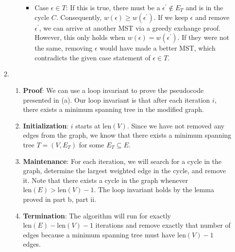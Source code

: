 \documentclass{article}
\begin{document}
\begin{enumerate}
\begin{enumerate}
\begin{enumerate}
\begin{itemize}
                            \item Case $\epsilon \in T$: If this is true, there must be a $\epsilon^\prime
                                \not\in E_T$ and is in the cycle $C$. Consequently, $w\left(\epsilon\right)
                                \geq w\left(\epsilon^{\prime}\right)$. If we keep $\epsilon$ and
                                remove $\epsilon^\prime$, we can arrive at another MST via a greedy
                                exchange proof. However, this only holds when $w\left(\epsilon\right) =
                                w\left(\epsilon^\prime\right)$. If they were not the same, removing $
                                \epsilon$ would have made a better MST, which contradicts the given case
                                statement of $\epsilon \in T$.
                        \end{itemize}

                \end{enumerate}
                
            \item 
                \begin{enumerate}
                    \item \textbf{Proof}: We can use a loop invariant to prove the 
                    pseudocode presented in (a). Our loop invariant is that after each
                    iteration $i$, there exists a minimum spanning tree in the modified graph.
                    \item \textbf{Initialization}: $i$ starts at $\text{len}\left(V\right)$.
                    Since we have not removed any edges from the graph, we know that 
                    there exists a minimum spanning tree $T = \left(V, E_T\right)$ for some $E_T \subseteq E$.
                    \item \textbf{Maintenance}: For each iteration, we will search for a cycle in the graph,
                        determine the largest weighted edge in the cycle, and remove it. Note that there exists
                        a cycle in the graph whenever $\text{len}\left(E\right) > \text{len}\left(V\right) - 1$.
                        The loop invariant holds by the lemma proved in part b, part ii.
                    \item \textbf{Termination}: The algorithm will run for exactly $\text{len}\left(E\right) 
                        - \text{len}\left(V\right) - 1$ iterations and remove exactly that number of edges because
                        a minimum spanning tree must have $\text{len}\left(V\right) - 1$ edges.
                \end{enumerate}
            

\end{enumerate}
\end{enumerate}
\end{document}
